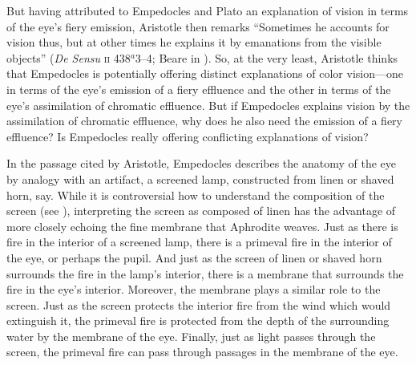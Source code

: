 But having attributed to Empedocles and Plato an explanation of vision in terms of the eye's fiery emission, Aristotle then remarks ``Sometimes he accounts for vision thus, but at other times he explains it by emanations from the visible objects'' (\emph{De Sensu} \textsc{ii} 438\( ^{a} \)3--4; Beare in \citealt[5]{Barnes:1984uq}). So, at the very least, Aristotle thinks that Empedocles is potentially offering distinct explanations of color vision---one in terms of the eye's emission of a fiery effluence and the other in terms of the eye's assimilation of chromatic effluence. But if Empedocles explains vision by the assimilation of chromatic effluence, why does he also need the emission of a fiery effluence? Is Empedocles really offering conflicting explanations of vision?

In the passage cited by Aristotle, Empedocles describes the anatomy of the eye by analogy with an artifact, a screened lamp, constructed from linen or shaved horn, say. While it is controversial how to understand the composition of the screen (see \citealt[240--241]{Wright:1981zr}), interpreting the screen as composed of linen has the advantage of more closely echoing the fine membrane that Aphrodite weaves. Just as there is fire in the interior of a screened lamp, there is a primeval fire in the interior of the eye, or perhaps the pupil. And just as the screen of linen or shaved horn surrounds the fire in the lamp's interior, there is a membrane that surrounds the fire in the eye's interior. Moreover, the membrane plays a similar role to the screen. Just as the screen protects the interior fire from the wind which would extinguish it, the primeval fire is protected from the depth of the surrounding water by the membrane of the eye. Finally, just as light passes through the screen, the primeval fire can pass through passages in the membrane of the eye. 

